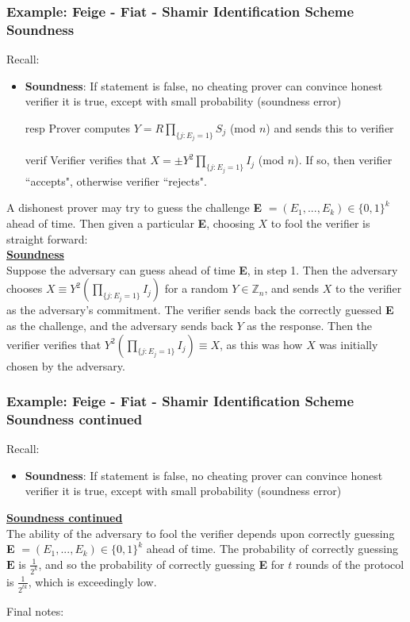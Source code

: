 \documentclass{beamer}
\begin{document}
\begin{frame}
\begin{footnotesize}
\frametitle{Example: Feige - Fiat - Shamir Identification Scheme \\Soundness}
Recall: 
\begin{itemize}
\item \textbf{Soundness}: If statement is false, no cheating prover can convince honest verifier it is true, except with small probability (soundness error)
\item[resp] Prover computes $Y = R\prod_{\{j:E_j = 1\}} S_j$ (mod $n$) and sends this to verifier
\item[verif] Verifier verifies that $X = \pm Y^2\prod_{\{j:E_j = 1\}}I_j$ (mod $n$). If so, then verifier ``accepts", otherwise verifier ``rejects".
\end{itemize}
A dishonest prover may try to guess the challenge \textbf{E} $= (E_1, ..., E_k)\in\{0,1\}^k$ ahead of time. Then given a particular \textbf{E}, choosing $X$ to fool the verifier is straight forward: 
\vspace{2mm}
\\ \underline{\textbf{Soundness}}
\\Suppose the adversary can guess ahead of time \textbf{E}, in step 1. Then the adversary chooses $X\equiv Y^2(\prod_{\{j:E_j = 1\}}I_j)$ for a random $Y\in\mathbb{Z}_n$, and sends $X$ to the verifier as the adversary's commitment. The verifier sends back the correctly guessed \textbf{E} as the challenge, and the adversary sends back $Y$ as the response. Then the verifier verifies that $Y^2(\prod_{\{j:E_j = 1\}}I_j)\equiv X$, as this was how $X$ was initially chosen by the adversary. 

\end{footnotesize}
\end{frame}

\begin{frame}
\begin{small}
\frametitle{Example: Feige - Fiat - Shamir Identification Scheme \\Soundness continued}
Recall:
\begin{itemize}
\item \textbf{Soundness}: If statement is false, no cheating prover can convince honest verifier it is true, except with small probability (soundness error)
\end{itemize}
\underline{\textbf{Soundness continued}}
\\The ability of the adversary to fool the verifier depends upon correctly guessing \textbf{E} $= (E_1, ..., E_k)\in\{0,1\}^k$ ahead of time. The probability of correctly guessing $\textbf{E}$ is $\frac{1}{2^k}$, and so the probability of correctly guessing \textbf{E} for $t$ rounds of the protocol is $\frac{1}{2^{tk}}$, which is exceedingly low.

\pause
\vspace{5mm}
Final notes: 

\end{small}
\end{frame}
\end{document}
